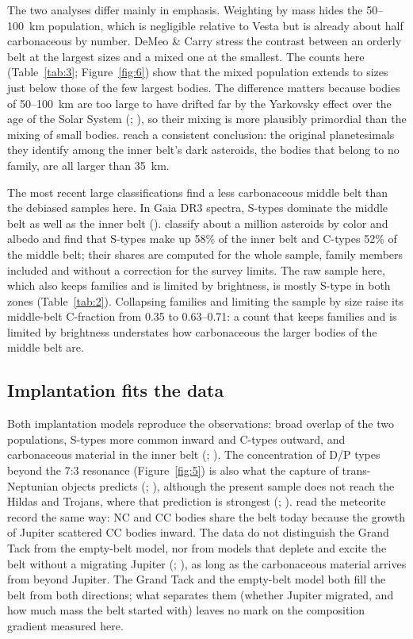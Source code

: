 \documentclass[twocolumn]{aastex701}
\begin{document}
The two analyses differ mainly in emphasis. Weighting by mass hides the 50–100~km population, which is negligible relative to Vesta but is already about half carbonaceous by number. DeMeo \& Carry stress the contrast between an orderly belt at the largest sizes and a mixed one at the smallest. The counts here (Table~\ref{tab:3}; Figure~\ref{fig:6}) show that the mixed population extends to sizes just below those of the few largest bodies. The difference matters because bodies of 50–100~km are too large to have drifted far by the Yarkovsky effect over the age of the Solar System (\citealt{bottke2006}; \citealt{demeo2014}), so their mixing is more plausibly primordial than the mixing of small bodies. \citet{delbo2017} reach a consistent conclusion: the original planetesimals they identify among the inner belt’s dark asteroids, the bodies that belong to no family, are all larger than 35~km.

The most recent large classifications find a less carbonaceous middle belt than the debiased samples here. In Gaia DR3 spectra, S-types dominate the middle belt as well as the inner belt (\citealt{tinautruano2026}). \citet{vavra2026} classify about a million asteroids by color and albedo and find that S-types make up 58\% of the inner belt and C-types 52\% of the middle belt; their shares are computed for the whole sample, family members included and without a correction for the survey limits. The raw sample here, which also keeps families and is limited by brightness, is mostly S-type in both zones (Table~\ref{tab:2}). Collapsing families and limiting the sample by size raise its middle-belt C-fraction from 0.35 to 0.63–0.71: a count that keeps families and is limited by brightness understates how carbonaceous the larger bodies of the middle belt are.

\subsection{Implantation fits the data}\label{sec:5.3}
Both implantation models reproduce the observations: broad overlap of the two populations, S-types more common inward and C-types outward, and carbonaceous material in the inner belt (\citealt{walsh2012}; \citealt{raymond2017b}). The concentration of D/P types beyond the 7:3 resonance (Figure~\ref{fig:5}) is also what the capture of trans-Neptunian objects predicts (\citealt{levison2009}; \citealt{vokrouhlicky2016}), although the present sample does not reach the Hildas and Trojans, where that prediction is strongest (\citealt{morbidelli2005}; \citealt{vokrouhlicky2016}). \citet{kleine2020} read the meteorite record the same way: NC and CC bodies share the belt today because the growth of Jupiter scattered CC bodies inward. The data do not distinguish the Grand Tack from the empty-belt model, nor from models that deplete and excite the belt without a migrating Jupiter (\citealt{izidoro2016}; \citealt{clement2019}), as long as the carbonaceous material arrives from beyond Jupiter. The Grand Tack and the empty-belt model both fill the belt from both directions; what separates them (whether Jupiter migrated, and how much mass the belt started with) leaves no mark on the composition gradient measured here.
\end{document}
